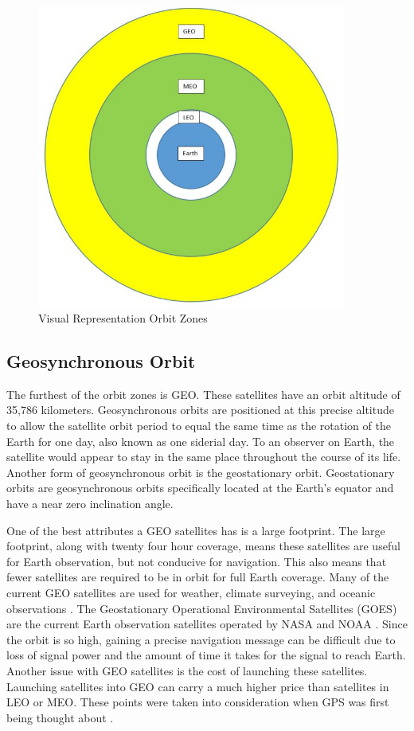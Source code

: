 \documentclass[12pt]{report}
\begin{document}
\begin{figure}
    \centering
    \includegraphics[width=4in]{satellite_orbit_zones.JPG}
    \caption{Visual Representation Orbit Zones}
    \label{fig:satorbzone}

\end{figure}

\subsection{Geosynchronous Orbit}
The furthest of the orbit zones is GEO. These satellites have an orbit altitude of 35,786 kilometers. Geosynchronous orbits are positioned at this precise altitude to allow the satellite orbit period to equal the same time as the rotation of the Earth for one day, also known as one siderial day. To an observer on Earth, the satellite would appear to stay in the same place throughout the course of its life. Another form of geosynchronous orbit is the geostationary orbit. Geostationary orbits are geosynchronous orbits specifically located at the Earth's equator and have a near zero inclination angle. 

One of the best attributes a GEO satellites has is a large footprint. The large footprint, along with twenty four hour coverage, means these satellites are useful for Earth observation, but not conducive for navigation. This also means that fewer satellites are required to be in orbit for full Earth coverage. Many of the current GEO satellites are used for weather, climate surveying, and oceanic observations \cite{usdepartmentofcommerceSatellites}. The Geostationary Operational Environmental Satellites (GOES) are the current Earth observation satellites operated by NASA and NOAA \cite{garnerGOESOverviewHistory2015}. Since the orbit is so high, gaining a precise navigation message can be difficult due to loss of signal power and the amount of time it takes for the signal to reach Earth. Another issue with GEO satellites is the cost of launching these satellites. Launching satellites into GEO can carry a much higher price than satellites in LEO or MEO. These points were taken into consideration when GPS was first being thought about \cite{misraGlobalPositioningSystem2012}.
\end{document}
